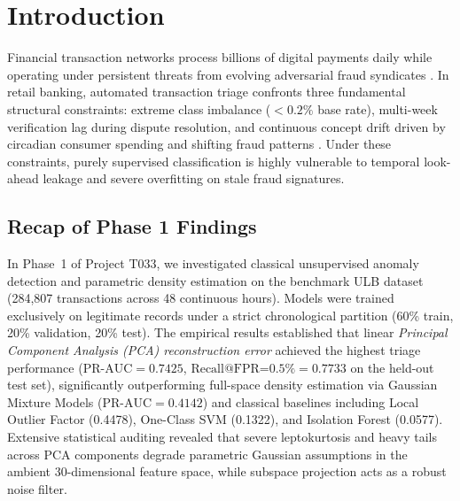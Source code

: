 
\section{Introduction}
\label{sec:p2_introduction}

Financial transaction networks process billions of digital payments daily while operating under persistent threats from evolving adversarial fraud syndicates \cite{dalpozzolo2018credit, leborgne2022handbook}. In retail banking, automated transaction triage confronts three fundamental structural constraints: extreme class imbalance ($<0.2\%$ base rate), multi-week verification lag during dispute resolution, and continuous concept drift driven by circadian consumer spending and shifting fraud patterns \cite{dalpozzolo2015calibrating, lucas2020dataset}. Under these constraints, purely supervised classification is highly vulnerable to temporal look-ahead leakage and severe overfitting on stale fraud signatures.

\subsection{Recap of Phase 1 Findings}
\label{sec:p1_recap}
In Phase~1 of Project T033, we investigated classical unsupervised anomaly detection and parametric density estimation on the benchmark ULB dataset (284,807 transactions across 48 continuous hours). Models were trained exclusively on legitimate records under a strict chronological partition (60\% train, 20\% validation, 20\% test). The empirical results established that linear \emph{Principal Component Analysis (PCA) reconstruction error} achieved the highest triage performance ($\text{PR-AUC} = 0.7425$, $\text{Recall@FPR=0.5\%} = 0.7733$ on the held-out test set), significantly outperforming full-space density estimation via Gaussian Mixture Models ($\text{PR-AUC} = 0.4142$) and classical baselines including Local Outlier Factor (0.4478), One-Class SVM (0.1322), and Isolation Forest (0.0577). Extensive statistical auditing revealed that severe leptokurtosis and heavy tails across PCA components degrade parametric Gaussian assumptions in the ambient 30-dimensional feature space, while subspace projection acts as a robust noise filter.

